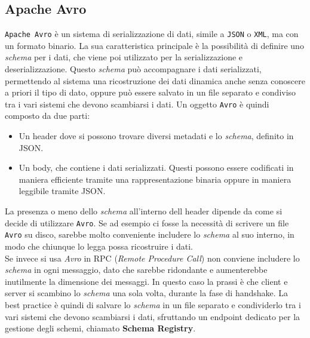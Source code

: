 \subsection{Apache Avro}
\label{subsec:avro_overview}
\texttt{Apache Avro} è un sistema di serializzazione di dati, simile a \texttt{JSON} o \texttt{XML}, ma con un formato binario.
La sua caratteristica principale è la possibilità di definire uno \textit{schema} per i dati, che viene poi utilizzato per la serializzazione e deserializzazione.
Questo \textit{schema} può accompagnare i dati serializzati, permettendo al sistema una ricostruzione dei dati dinamica anche senza conoscere a priori il tipo di dato,
oppure può essere salvato in un file separato e condiviso tra i vari sistemi che devono scambiarsi i dati.
Un oggetto \texttt{Avro} è quindi composto da due parti: 
\begin{itemize}
    \item Un header dove si possono trovare diversi metadati e lo \textit{schema}, definito in JSON.
    \item Un body, che contiene i dati serializzati.
    Questi possono essere codificati in maniera efficiente tramite una rappresentazione binaria oppure in maniera leggibile tramite JSON.
\end{itemize}
La presenza o meno dello \textit{schema} all'interno dell header dipende da come si decide di utilizzare \texttt{Avro}.
Se ad esempio ci fosse la necessità di scrivere un file \texttt{Avro} su disco, sarebbe molto conveniente includere lo \textit{schema} al suo interno,
in modo che chiunque lo legga possa ricostruire i dati.\\
Se invece si usa \textit{Avro} in RPC (\textit{Remote Procedure Call}) non conviene includere lo \textit{schema} in ogni messaggio,
dato che sarebbe ridondante e aumenterebbe inutilmente la dimensione dei messaggi.
In questo caso la prassi è che client e server si scambino lo \textit{schema} una sola volta, durante la fase di handshake.
La best practice è quindi di salvare lo \textit{schema} in un file separato e condividerlo tra i vari sistemi che devono scambiarsi i dati, sfruttando un endpoint dedicato per la gestione degli schemi,
chiamato \textbf{Schema Registry}.

